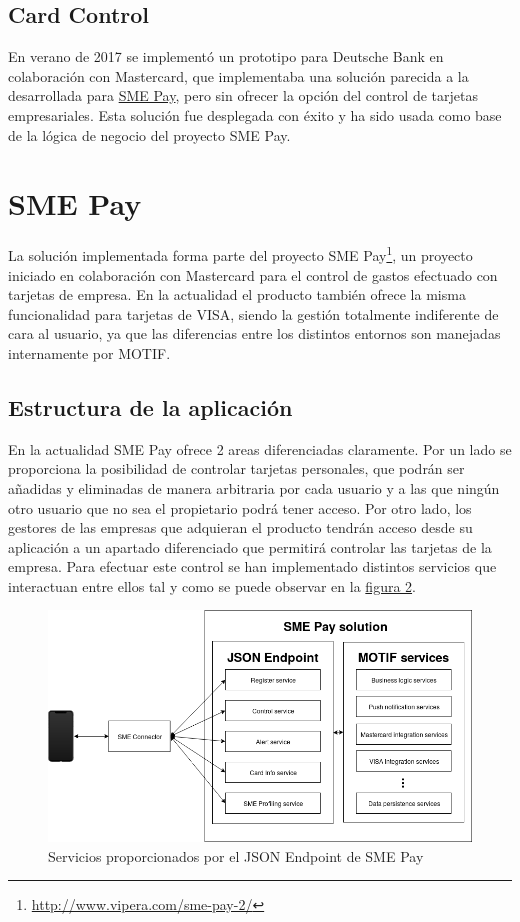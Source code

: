 \documentclass[a4paper, 12pt]{article}
\begin{document}
\subsection{Card Control}
\label{sec-2-4}
En verano de 2017 se implementó un prototipo para Deutsche Bank en colaboración con Mastercard, que implementaba una solución parecida
a la desarrollada para \hyperref[sec:smepay]{SME Pay}, pero sin ofrecer la opción del control de tarjetas empresariales. Esta solución fue desplegada con éxito
y ha sido usada como base de la lógica de negocio del proyecto SME Pay.
\section{SME Pay}
\label{sec-3}
\label{sec:smepay}
La solución implementada forma parte del proyecto SME Pay\footnote{\url{http://www.vipera.com/sme-pay-2/}}, un proyecto iniciado en colaboración con Mastercard para el control
de gastos efectuado con tarjetas de empresa. En la actualidad el producto también ofrece la misma funcionalidad para tarjetas de VISA,
siendo la gestión totalmente indiferente de cara al usuario, ya que las diferencias entre los distintos entornos son manejadas internamente
por MOTIF.
\subsection{Estructura de la aplicación}
\label{sec-3-1}
En la actualidad SME Pay ofrece 2 areas diferenciadas claramente. Por un lado se proporciona la posibilidad de controlar tarjetas personales,
que podrán ser añadidas y eliminadas de manera arbitraria por cada usuario y a las que ningún otro usuario que no sea el propietario podrá tener
acceso. Por otro lado, los gestores de las empresas que adquieran el producto tendrán acceso desde su aplicación a un apartado diferenciado que
permitirá controlar las tarjetas de la empresa. Para efectuar este control se han implementado distintos servicios que interactuan entre ellos
tal y como se puede observar en la \hyperref[fig:sme-services]{figura 2}.
\begin{figure}[htb]
\centering
\includegraphics[width=.9\linewidth]{./images/smepay.png}
\caption{\label{fig:sme-services}Servicios proporcionados por el JSON Endpoint de SME Pay}
\end{figure}
\end{document}
